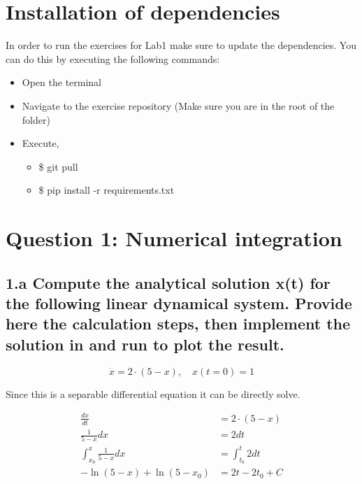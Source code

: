 \documentclass{cmc}
\begin{document}
\section*{Installation of dependencies}
\label{sec:inst-depend}

In order to run the exercises for Lab1 make sure to update the
dependencies.  You can do this by executing the following commands:

\begin{itemize}
\item Open the terminal
\item Navigate to the exercise repository (Make sure you are in the
  root of the folder)
\item Execute,
  \begin{itemize}
  	\item \$ git pull
  	\item \$ pip install -r requirements.txt
  \end{itemize}
\end{itemize}

\newpage
\section*{Question 1: Numerical integration}

\subsection*{1.a Compute the analytical solution x(t) %
  for the following linear dynamical system. Provide here the calculation steps,
  then implement the solution in
  and run  to plot the result.}

\begin{equation}
  \label{eq:ode-1}
  \dot{x} = 2 \cdot (5 - x), \quad x(t=0)=1
\end{equation}

Since this is a separable differential equation it can be directly solve.

\begin{align*}
	\frac{dx}{dt} &= 2 \cdot (5-x) \\
	\frac{1}{5-x} dx &= 2 dt \\
	\int_{x_0}^x \frac{1}{5-x} dx &= \int_{t_0}^t 2 dt \\
	-\ln(5-x) + \ln(5-x_0) &= 2t - 2t_0 +C
\end{align*}
\end{document}
